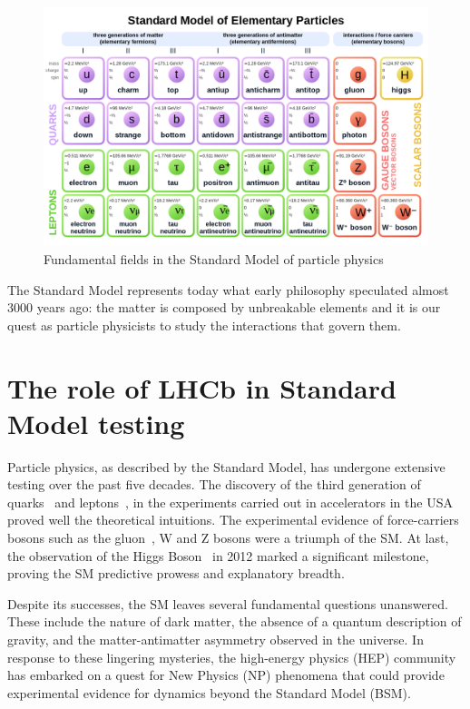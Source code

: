 \begin{figure}
    \centering
    \includegraphics[width=\textwidth]{figures/Standard_Model_of_Elementary_Particles_Anti.svg.png}
    \caption{Fundamental fields in the Standard Model of particle physics}
    \label{fig:SM}
\end{figure}


The Standard Model represents today what early philosophy speculated almost 3000 years ago: the matter is composed by unbreakable elements and it is our quest as particle physicists to study the interactions that govern them.


\section{The role of LHCb in Standard Model testing}
Particle physics, as described by the Standard Model, has undergone extensive testing over the past five decades. The discovery of the third generation of quarks~\cite{E288:1977xhf, CDF:1995wbb} and leptons~\cite{PhysRevLett.35.1489}, in the experiments carried out in accelerators in the USA proved well the theoretical intuitions. The experimental evidence of force-carriers bosons such as the gluon~\cite{BERGER1979449}, W and Z bosons \cite{UA1:1983mne, UA2:1983mlz} were a triumph of the SM. At last, the  observation of the Higgs Boson~\cite{Aad_2012, Chatrchyan_2012} in 2012 marked a significant milestone, proving the SM predictive prowess and explanatory breadth. 

Despite its successes, the SM leaves several fundamental questions unanswered. These include the nature of dark matter, the absence of a quantum description of gravity, and the matter-antimatter asymmetry observed in the universe. In response to these lingering mysteries, the high-energy physics (HEP) community has embarked on a quest for New Physics (NP) phenomena that could provide experimental evidence for dynamics beyond the Standard Model (BSM). 

